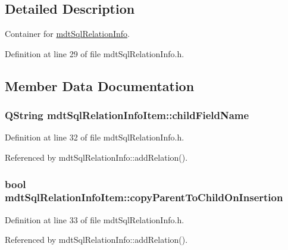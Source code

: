 \subsection{Detailed Description}
Container for \hyperlink{classmdt_sql_relation_info}{mdt\-Sql\-Relation\-Info}. 

Definition at line 29 of file mdt\-Sql\-Relation\-Info.\-h.



\subsection{Member Data Documentation}
\hypertarget{structmdt_sql_relation_info_item_a472e45de5f24377bb92740ece7f34a07}{
\subsubsection[{child\-Field\-Name}]{\setlength{\rightskip}{0pt plus 5cm}Q\-String mdt\-Sql\-Relation\-Info\-Item\-::child\-Field\-Name}}\label{structmdt_sql_relation_info_item_a472e45de5f24377bb92740ece7f34a07}


Definition at line 32 of file mdt\-Sql\-Relation\-Info.\-h.



Referenced by mdt\-Sql\-Relation\-Info\-::add\-Relation().

\hypertarget{structmdt_sql_relation_info_item_ad0c6a47d4463fd80f1696bbfc6c3b402}{
\subsubsection[{copy\-Parent\-To\-Child\-On\-Insertion}]{\setlength{\rightskip}{0pt plus 5cm}bool mdt\-Sql\-Relation\-Info\-Item\-::copy\-Parent\-To\-Child\-On\-Insertion}}\label{structmdt_sql_relation_info_item_ad0c6a47d4463fd80f1696bbfc6c3b402}


Definition at line 33 of file mdt\-Sql\-Relation\-Info.\-h.



Referenced by mdt\-Sql\-Relation\-Info\-::add\-Relation().

